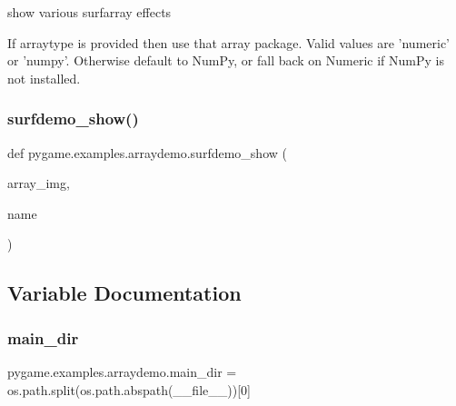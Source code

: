 \begin{DoxyVerb}show various surfarray effects

If arraytype is provided then use that array package. Valid
values are 'numeric' or 'numpy'. Otherwise default to NumPy,
or fall back on Numeric if NumPy is not installed.\end{DoxyVerb}
 \mbox{\label{namespacepygame_1_1examples_1_1arraydemo_afb5977b771166323b988670ef8e30761}} 
\subsubsection{\texorpdfstring{surfdemo\+\_\+show()}{surfdemo\_show()}}
{\footnotesize\ttfamily def pygame.\+examples.\+arraydemo.\+surfdemo\+\_\+show (\begin{DoxyParamCaption}\item[{}]{array\+\_\+img,  }\item[{}]{name }\end{DoxyParamCaption})}



\subsection{Variable Documentation}
\mbox{\label{namespacepygame_1_1examples_1_1arraydemo_ac7c6ac0bed98157e2c7d6ad2992a55c8}} 
\subsubsection{\texorpdfstring{main\+\_\+dir}{main\_dir}}
{\footnotesize\ttfamily pygame.\+examples.\+arraydemo.\+main\+\_\+dir = os.\+path.\+split(os.\+path.\+abspath(\+\_\+\+\_\+file\+\_\+\+\_\+))\mbox{[}0\mbox{]}}

